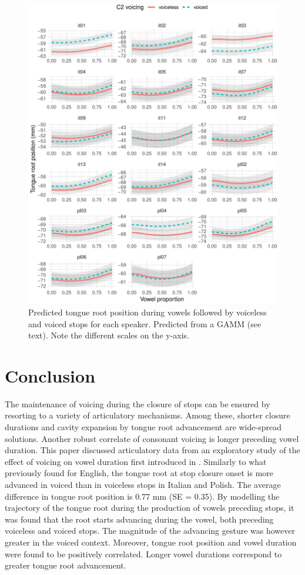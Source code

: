 \documentclass[12pt,]{article}
\begin{document}
\begin{figure}
\includegraphics[width=\linewidth]{2018-tra_files/figure-latex/tra-gam-s-ar-plot-1} \caption{Predicted tongue root position during vowels followed by voiceless and voiced stops for each speaker. Predicted from a GAMM (see text). Note the different scales on the y-axis.}\label{f:tra-gam-s-ar-plot}
\end{figure}

\hypertarget{conclusion}{%
\section{Conclusion}\label{conclusion}}

The maintenance of voicing during the closure of stops can be ensured by
resorting to a variety of articulatory mechanisms. Among these, shorter
closure durations and cavity expansion by tongue root advancement are
wide-spread solutions. Another robust correlate of consonant voicing is
longer preceding vowel duration. This paper discussed articulatory data
from an exploratory study of the effect of voicing on vowel duration
first introduced in \citet{coretta2018j}. Similarly to what previously
found for English, the tongue root at stop closure onset is more
advanced in voiced than in voiceless stops in Italian and Polish. The
average difference in tongue root position is 0.77 mm (SE = 0.35). By
modelling the trajectory of the tongue root during the production of
vowels preceding stops, it was found that the root starts advancing
during the vowel, both preceding voiceless and voiced stops. The
magnitude of the advancing gesture was however greater in the voiced
context. Moreover, tongue root position and vowel duration were found to
be positively correlated. Longer vowel durations correspond to greater
tongue root advancement.
\end{document}

